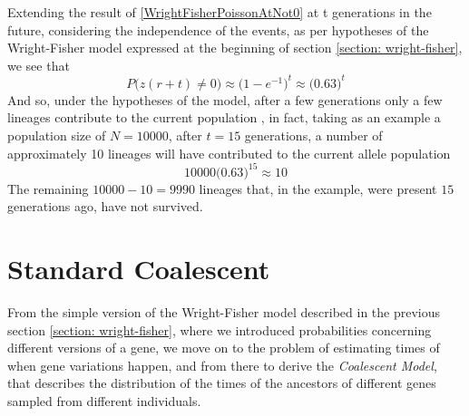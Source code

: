 \documentclass[12pt,mythesisstyle]{report}
\begin{document}
Extending the result of \eqref{WrightFisherPoissonAtNot0} at t generations in the future, considering the independence of the events, as per hypotheses of the Wright-Fisher model expressed at the beginning of section \ref{section: wright-fisher}, we see that
\begin{equation}\label{WrightFisherPoissonAtfuture}
P\big(z(r+t) \neq 0\big) \approx \big(1- e^{-1}\big)^t \approx \big(0.63\big)^t
\end{equation}
And so, under the hypotheses of the model, after a few generations only a few lineages contribute to the current population \cite{coalescentPrimer}, in fact, taking as an example a population size of $N=10000$, after $t=15$ generations, a number of approximately 10 lineages will have contributed to the current allele population
\begin{equation}\label{exampleWrightFisher}
10000\big(0.63\big)^{15} \approx 10
\end{equation}
The remaining $10000-10=9990$ lineages that, in the example, were present $15$ generations ago, have not survived.

\section{Standard Coalescent}\label{section: coalescent}
From the simple version of the Wright-Fisher model described in the previous section \ref{section: wright-fisher}, where we introduced probabilities concerning different versions of a gene, we move on to the problem of estimating times of when gene variations happen, and from there to derive the \textit{Coalescent Model}, that describes the distribution of the times of the ancestors of different genes sampled from different individuals.
\end{document}

